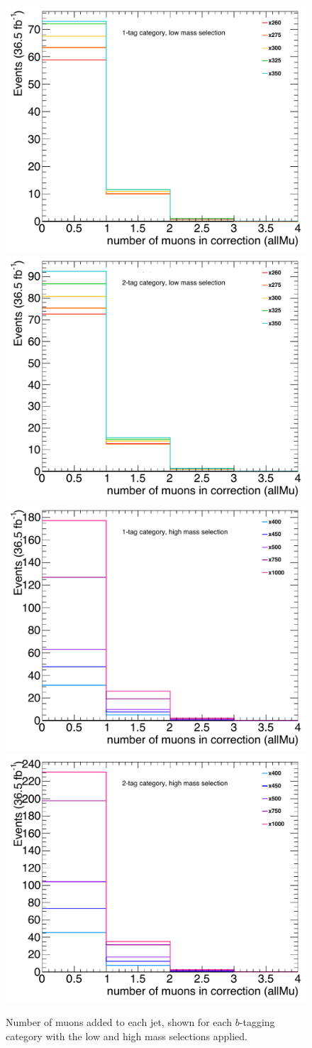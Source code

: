 \begin{figure}[!ht]
  \centering
  \includegraphics[height=0.32\textwidth]{chapters/chapter5_yybb/images/muon-in-jet/all_mu_n_allMu_low_1_clean.pdf}
  \includegraphics[height=0.32\textwidth]{chapters/chapter5_yybb/images/muon-in-jet/all_mu_n_allMu_low_2_clean.pdf} \\
  \includegraphics[height=0.32\textwidth]{chapters/chapter5_yybb/images/muon-in-jet/all_mu_n_allMu_high_1_clean.pdf}
  \includegraphics[height=0.32\textwidth]{chapters/chapter5_yybb/images/muon-in-jet/all_mu_n_allMu_high_2_clean.pdf} \\
  \caption[Number of muons added to each jet, shown for each $b$-tagging category with the low and high mass  selections applied]{Number of muons added to each jet, shown for each $b$-tagging category with the low and high mass  selections applied.}
  \label{fig:n_muons}
\end{figure}



